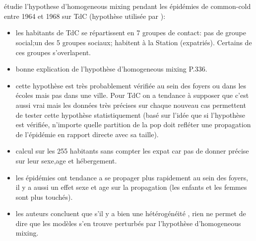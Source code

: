 \documentclass{article}
\begin{document}
\section{\cite{Becker1983}}
étudie l'hypothese d'homogeneous mixing pendant les épidémies de common-cold entre 1964 et 1968 sur TdC (hypothèse utilisée par \citet{Hammond1971}):
\begin{itemize}
\item les habitants de TdC se répartissent en 7 groupes de contact: pas de groupe social;un des 5 groupes sociaux; habitent à la Station (expatriés). Certains de ces groupes s'overlapent.
\item bonne explication de l'hypothèse d'homogeneous mixing P.336.
\item cette hypothèse est très probablement vérifiée au sein des foyers ou dans les écoles mais pas dans une ville. Pour TdC on a tendance à supposer que c'est aussi vrai mais les données très précises sur chaque nouveau cas permettent de tester cette hypothèse statistiquement (basé sur l'idée que si l'hypothèse est vérifiée, n'importe quelle partition de la pop doit refléter une propagation de l'épidémie en rapport directe avec sa taille).
\item calcul sur les 255 habitants sans compter les expat car pas de donner précise sur leur sexe,age et hébergement.
\item les épidémies ont tendance a se propager plus rapidement au sein des foyers, il y a aussi un effet sexe et age sur la propagation (les enfants et les femmes sont plus touchés).
\item les auteurs concluent que s'il y a bien une hétérogénéité , rien ne permet de dire que les modèles s'en trouve perturbés par l'hypothèse d'homogeneous mixing.  
\end{itemize}
\end{document}
